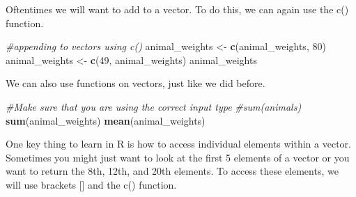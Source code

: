 \documentclass[]{article}
\newenvironment{Shaded}{\begin{snugshade}}{\end{snugshade}}
\newcommand{\KeywordTok}[1]{\textcolor[rgb]{0.13,0.29,0.53}{\textbf{{#1}}}}
\newcommand{\DecValTok}[1]{\textcolor[rgb]{0.00,0.00,0.81}{{#1}}}
\newcommand{\StringTok}[1]{\textcolor[rgb]{0.31,0.60,0.02}{{#1}}}
\newcommand{\CommentTok}[1]{\textcolor[rgb]{0.56,0.35,0.01}{\textit{{#1}}}}
\newcommand{\NormalTok}[1]{{#1}}
\begin{document}
Oftentimes we will want to add to a vector. To do this, we can again use
the c() function.

\begin{Shaded}
\begin{Highlighting}[]
\CommentTok{#appending to vectors using c()}
\NormalTok{animal_weights <-}\StringTok{ }\KeywordTok{c}\NormalTok{(animal_weights, }\DecValTok{80}\NormalTok{)}
\NormalTok{animal_weights <-}\StringTok{ }\KeywordTok{c}\NormalTok{(}\DecValTok{49}\NormalTok{, animal_weights)}
\NormalTok{animal_weights}
\end{Highlighting}
\end{Shaded}

We can also use functions on vectors, just like we did before.

\begin{Shaded}
\begin{Highlighting}[]
\CommentTok{#Make sure that you are using the correct input type}
\CommentTok{#sum(animals)}
\KeywordTok{sum}\NormalTok{(animal_weights)}
\KeywordTok{mean}\NormalTok{(animal_weights)}
\end{Highlighting}
\end{Shaded}

One key thing to learn in R is how to access individual elements within
a vector. Sometimes you might just want to look at the first 5 elements
of a vector or you want to return the 8th, 12th, and 20th elements. To
access these elements, we will use brackets {[}{]} and the c() function.

\begin{Shaded}
\end{Shaded}
\end{document}
